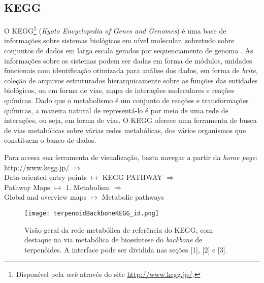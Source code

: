 
\subsection{KEGG}

\indent O KEGG\footnote{Disponível pela \textit{web} através do site \url{http://www.kegg.jp/}.} (\textit{Kyoto Encyclopedia of Genes and Genomes}) é uma base de informações sobre sistemas biológicos em nível molecular, sobretudo sobre conjuntos de dados em larga escala gerados por sequenciamento de genoma \cite{keggOverview}. As informações sobre os sistemas podem ser dadas em forma de módulos, unidades funcionais com identificação otimizada para análise dos dados, em forma de \textit{brite}, coleção de arquivos estruturados hierarquicamente sobre as funções das entidades biológicos, ou em forma de vias, mapa de interações moleculares e reações químicas. Dado que o metabolismo é um conjunto de reações e transformações químicas, a maneira natural de representá-lo é por meio de uma rede de interações, ou seja, em forma de vias. O KEGG oferece uma ferramenta de busca de vias metabólicas sobre várias redes metabólicas, dos vários organismos que constituem o banco de dados.

\indent Para acessa sua ferramenta de visualização, basta navegar a partir da \textit{home page}: \\

\indent \url{http://www.kegg.jp/} $\Rightarrow$ \\
\indent Data-oriented entry points  $\mapsto$ KEGG PATHWAY $\Rightarrow$ \\
\indent Pathway Maps $\mapsto$ 1. Metabolism  $\Rightarrow$ \\
 Global and overview maps $\mapsto$ Metabolic pathways \\

\begin{figure}[!h]
\centering
\texttt{[image: terpenoidBackboneKEGG\_id.png]}
\caption{Visão geral da rede metabólica de referência do KEGG, com destaque na via metabólica de biossíntese do \textit{backbone} de terpenóides. A interface pode ser dividida nas seções [1], [2] e [3].}
\label{terpenoidBackboneKEGG_id}
\end{figure}

